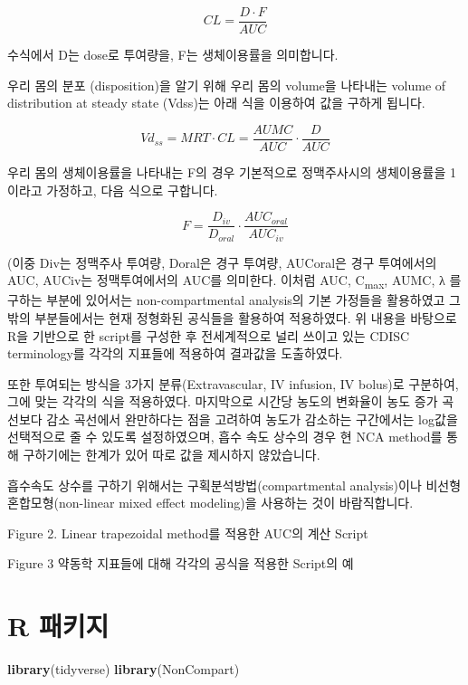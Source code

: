 \documentclass[]{krantz}
\makeatletter
\newenvironment{Shaded}{\begin{snugshade}}{\end{snugshade}}
\newcommand{\KeywordTok}[1]{\textcolor[rgb]{0.13,0.29,0.53}{\textbf{#1}}}
\newcommand{\NormalTok}[1]{#1}
\newenvironment{kframe}{%
\medskip{}
\setlength{\fboxsep}{.8em}
 \def\at@end@of@kframe{}%
 \ifinner\ifhmode%
  \def\at@end@of@kframe{\end{minipage}}%
  \begin{minipage}{\columnwidth}%
 \fi\fi%
 \def\FrameCommand##1{\hskip\@totalleftmargin \hskip-\fboxsep
 \colorbox{shadecolor}{##1}\hskip-\fboxsep
     \hskip-\linewidth \hskip-\@totalleftmargin \hskip\columnwidth}%
 \MakeFramed {\advance\hsize-\width
   \@totalleftmargin\z@ \linewidth\hsize
   \@setminipage}}%
 {\par\unskip\endMakeFramed%
 \at@end@of@kframe}
\renewenvironment{Shaded}{\begin{kframe}}{\end{kframe}}
\theoremstyle{definition}
\theoremstyle{definition}
\theoremstyle{definition}
\theoremstyle{remark}
\makeatother
\begin{document}
\[
CL = \frac{D \cdot F}{AUC}
\]

수식에서 D는 dose로 투여량을, F는 생체이용률을 의미합니다.

우리 몸의 분포 (disposition)을 알기 위해 우리 몸의 volume을 나타내는
volume of distribution at steady state (Vdss)는 아래 식을 이용하여 값을
구하게 됩니다.

\[
Vd_{ss} = MRT \cdot CL = \frac{AUMC}{AUC} \cdot \frac{D}{AUC}
\]

우리 몸의 생체이용률을 나타내는 F의 경우 기본적으로 정맥주사시의
생체이용률을 1이라고 가정하고, 다음 식으로 구합니다.

\[
F = \frac{D_{iv}}{D_{oral}} \cdot \frac{AUC_{oral}}{AUC_{iv}}
\]

(이중 Div는 정맥주사 투여량, Doral은 경구 투여량, AUCoral은 경구
투여에서의 AUC, AUCiv는 정맥투여에서의 AUC를 의미한다. 이처럼 AUC,
C\textsubscript{max}, AUMC, λ 를 구하는 부분에 있어서는
non-compartmental analysis의 기본 가정들을 활용하였고 그 밖의
부분들에서는 현재 정형화된 공식들을 활용하여 적용하였다. 위 내용을
바탕으로 R을 기반으로 한 script를 구성한 후 전세계적으로 널리 쓰이고
있는 CDISC terminology를 각각의 지표들에 적용하여 결과값을 도출하였다.

또한 투여되는 방식을 3가지 분류(Extravascular, IV infusion, IV bolus)로
구분하여, 그에 맞는 각각의 식을 적용하였다. 마지막으로 시간당 농도의
변화율이 농도 증가 곡선보다 감소 곡선에서 완만하다는 점을 고려하여
농도가 감소하는 구간에서는 log값을 선택적으로 줄 수 있도록 설정하였으며,
흡수 속도 상수의 경우 현 NCA method를 통해 구하기에는 한계가 있어 따로
값을 제시하지 않았습니다.

흡수속도 상수를 구하기 위해서는 구획분석방법(compartmental analysis)이나
비선형 혼합모형(non-linear mixed effect modeling)을 사용하는 것이
바람직합니다.

Figure 2. Linear trapezoidal method를 적용한 AUC의 계산 Script

Figure 3 약동학 지표들에 대해 각각의 공식을 적용한 Script의 예

\section{R 패키지}\label{r-packages}

\begin{Shaded}
\begin{Highlighting}[]
\KeywordTok{library}\NormalTok{(tidyverse)}
\KeywordTok{library}\NormalTok{(NonCompart)}
\end{Highlighting}
\end{Shaded}
\end{document}
